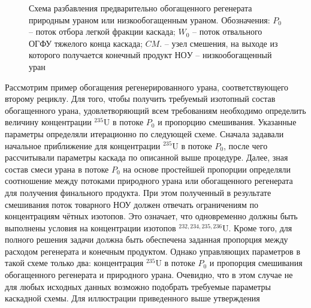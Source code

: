 \begin{figure}[ht]
  \caption{Схема разбавления предварительно обогащенного регенерата природным ураном или низкообогащенным ураном. Обозначения: $P_0$ -- поток отбора легкой фракции каскада; $W_0$ -- поток отвального ОГФУ тяжелого конца каскада; $CM.$ -- узел смешения, на выходе из которого получается конечный продукт $НОУ$ -- низкообогащенный уран}\label{o1}
\end{figure}

Рассмотрим пример обогащения регенерированного урана, соответствующего второму рециклу. Для того, чтобы получить требуемый изотопный состав обогащенного урана, удовлетворяющий всем требованиям необходимо определить величину концентрации $^{235}$U в потоке $P_0$ и пропорцию смешивания. Указанные параметры определяли итерационно по следующей схеме. Сначала задавали начальное приближение для концентрации $^{235}$U в потоке $P_0$, после чего рассчитывали параметры каскада по описанной выше процедуре. Далее, зная состав смеси урана в потоке $P_0$ на основе простейшей пропорции определяли соотношение между потоками природного урана или обогащенного регенерата для получения финального продукта. При этом полученный в результате смешивания поток товарного НОУ должен отвечать ограничениям по концентрациям чётных изотопов. Это означает, что одновременно должны быть выполнены условия на концентрации изотопов $^{232,234,235,236}$U. Кроме того, для полного решения задачи должна быть обеспечена заданная пропорция между расходом регенерата и конечным продуктом. Однако управляющих параметров в такой схеме только два: концентрация $^{235}$U в потоке $P_0$ и пропорция смешивания обогащенного регенерата и природного урана. Очевидно, что в этом случае не для любых исходных данных возможно подобрать требуемые параметры каскадной схемы. 
Для иллюстрации приведенного выше утверждения

